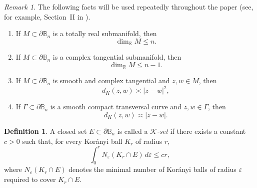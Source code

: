 \documentclass[a4paper,12pt]{amsart}
\theoremstyle{definition}
\newtheorem{defn}[thm]{Definition}
\theoremstyle{remark}
\newtheorem{rem}{Remark}
\def\Bn{\mathbb{B}_n}
\begin{document}
\begin{rem}
The following facts will be used repeatedly throughout the paper (see, for example, Section~II in \cite{Bruna1986}).

\begin{enumerate}
\item
If $M \subset \partial\Bn$ is a totally real submanifold, then
\begin{equation*}
    \dim_{\mathbb R} M \le n .
\end{equation*}

\item
If $M \subset \partial\Bn$ is a complex tangential submanifold, then
\begin{equation*}
    \dim_{\mathbb R} M \le n-1 .
\end{equation*}

\item
If $M \subset \partial\Bn$ is smooth and complex tangential and $z,w \in M$, then
\begin{equation*}
    d_K(z,w) \asymp |z-w|^2 ,
\end{equation*}
\item
If $\Gamma \subset \partial\Bn$ is a smooth compact transversal curve and $z,w \in \Gamma$,
then
\begin{equation*}
    d_K(z,w) \asymp |z-w| .
\end{equation*}
\end{enumerate}
\end{rem}


\begin{defn} {\cite{Bruna1986}}
A closed set $E \subset \partial\Bn$ is called a \emph{$\mathcal{K}$-set} if there exists a constant $c > 0$
such that, for every Korányi ball $K_r$ of radius $r$,
\begin{equation} \label{eq:K_set condition}
    \int_0^r N_\varepsilon(K_r \cap E)\, d\varepsilon \leq c r,
\end{equation}
where $N_\varepsilon(K_r \cap E)$ denotes the minimal number of Korányi balls
of radius $\varepsilon$ required to cover $K_r \cap E$.
\end{defn}
\end{document}

